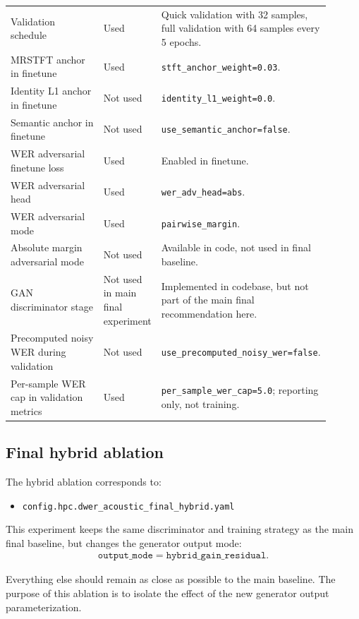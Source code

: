 \documentclass[11pt]{article}
\begin{document}
\begin{longtable}{>{\raggedright\arraybackslash}p{0.34\linewidth} >{\raggedright\arraybackslash}p{0.14\linewidth} >{\raggedright\arraybackslash}p{0.42\linewidth}}
Validation schedule & Used & Quick validation with 32 samples, full validation with 64 samples every 5 epochs. \\
MRSTFT anchor in finetune & Used & \texttt{stft\_anchor\_weight=0.03}. \\
Identity L1 anchor in finetune & Not used & \texttt{identity\_l1\_weight=0.0}. \\
Semantic anchor in finetune & Not used & \texttt{use\_semantic\_anchor=false}. \\
WER adversarial finetune loss & Used & Enabled in finetune. \\
WER adversarial head & Used & \texttt{wer\_adv\_head=abs}. \\
WER adversarial mode & Used & \texttt{pairwise\_margin}. \\
Absolute margin adversarial mode & Not used & Available in code, not used in final baseline. \\
GAN discriminator stage & Not used in main final experiment & Implemented in codebase, but not part of the main final recommendation here. \\
Precomputed noisy WER during validation & Not used & \texttt{use\_precomputed\_noisy\_wer=false}. \\
Per-sample WER cap in validation metrics & Used & \texttt{per\_sample\_wer\_cap=5.0}; reporting only, not training. \\
\bottomrule
\end{longtable}

\subsection{Final hybrid ablation}
The hybrid ablation corresponds to:
\begin{itemize}[leftmargin=*]
    \item \texttt{config.hpc.dwer\_acoustic\_final\_hybrid.yaml}
\end{itemize}

This experiment keeps the same discriminator and training strategy as the main final baseline, but changes the generator output mode:
\begin{align}
    \texttt{output\_mode} = \texttt{hybrid\_gain\_residual}.
\end{align}

Everything else should remain as close as possible to the main baseline. The purpose of this ablation is to isolate the effect of the new generator output parameterization.
\end{document}
